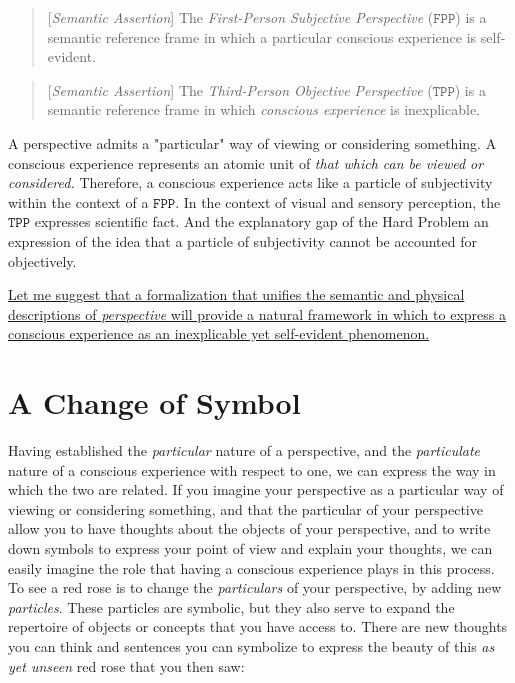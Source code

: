 \documentclass[runningheads]{llncs}
\begin{document}
\begin{quote}
[\emph{Semantic Assertion}] The \emph{First-Person Subjective Perspective} ($\texttt{FPP}$) is a semantic reference frame in which a particular conscious experience is self-evident.
\end{quote}

\begin{quote}
[\emph{Semantic Assertion}] The \emph{Third-Person Objective Perspective} ($\texttt{TPP}$) is a semantic reference frame in which \emph{conscious experience} is inexplicable.
\end{quote}

A perspective admits a "particular" way of viewing or considering something. A conscious experience represents an atomic unit of \emph{that which can be viewed or considered.} Therefore, a conscious experience acts like a particle of subjectivity within the context of a $\texttt{FPP}$. In the context of visual and sensory perception, the $\texttt{TPP}$ expresses scientific fact. And the explanatory gap of the Hard Problem an expression of the idea that a particle of subjectivity cannot be accounted for objectively.

\href{https://dna-platform.github.io/inexplicable-phenomena//a-novel-perspective/a-novel-perspective.html}{Let me suggest that a formalization that unifies the semantic and physical descriptions of \emph{perspective} will provide a natural framework in which to express a conscious experience as an inexplicable yet self-evident phenomenon.}\xspace

\section{A Change of Symbol}

Having established the \emph{particular} nature of a perspective, and the \emph{particulate} nature of a conscious experience with respect to one, we can express the way in which the two are related. If you imagine your perspective as a particular way of viewing or considering something, and that the particular of your perspective allow you to have thoughts about the objects of your perspective, and to write down symbols to express your point of view and explain your thoughts, we can easily imagine the role that having a conscious experience plays in this process. To see a red rose is to change the \emph{particulars} of your perspective, by adding new \emph{particles}. These particles are symbolic, but they also serve to expand the repertoire of objects or concepts that you have access to. There are new thoughts you can think and sentences you can symbolize to express the beauty of this \emph{as yet unseen} red rose that you then saw:
\end{document}
